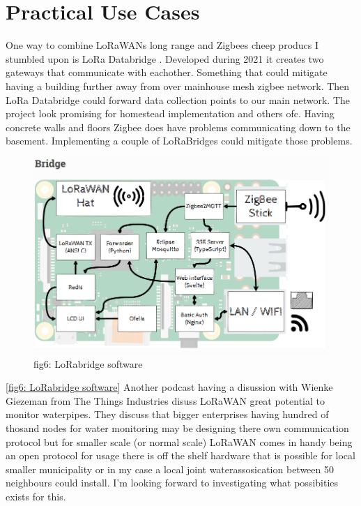 \documentclass[article,a4paper]{IEEEtran}
\begin{document}
    \section{Practical Use Cases}
    One way to combine LoRaWANs long range and Zigbees cheep producs I stumbled upon is LoRa Databridge \cite{LoRabridge}. Developed during 2021 it creates two gateways that communicate with eachother. Something that could mitigate having a building further away from over mainhouse mesh zigbee network. Then LoRa Databridge could forward data collection points to our main network. The project look promising for homestead implementation and others ofc. Having concrete walls and floors Zigbee does have problems communicating down to the basement. Implementing a couple of LoRaBridges could mitigate those problems. 
    \begin{figure}
        \includegraphics[width=\columnwidth]{LoRaBridge.png} 
        \caption{ fig6: LoRabridge software \cite{LoRaBridgeDocs} }
        \label{fig6: LoRabridge software }   
    \end{figure}
    \ref{fig6: LoRabridge software} 
    Another podcast having a disussion \cite{LoRaWANpodcast} with Wienke Giezeman from The Things Industries disuss LoRaWAN great potential to monitor waterpipes. They discuss that bigger enterprises having hundred of thosand nodes for water monitoring may be designing there own communication protocol but for smaller scale (or normal scale) LoRaWAN comes in handy being an open protocol for usage there is off the shelf hardware that is possible for local smaller municipality or in my case a local joint waterassosication between 50 neighbours could install. I'm looking forward to investigating what possibities exists for this. 
\end{document}
